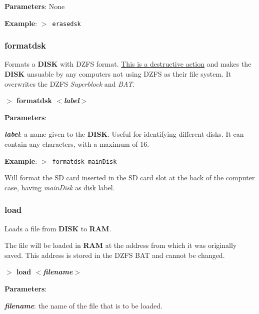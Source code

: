\documentclass[a4paper,11pt]{article}
\begin{document}
        \textbf{Parameters}: None

        \textbf{Example}: \texttt{$>$ erasedsk}

        \subsubsection{{\color{blue}formatdsk}}
        Formats a \textbf{DISK} with DZFS format. \underline{This is a
        destructive action} and makes the \textbf{DISK} unsuable by any
        computers not using DZFS as their file system. It overwrites the DZFS
        \textit{Superblock} and \textit{BAT}.

        \hspace{1.9cm}\textbf{$>$ formatdsk \textit{$<$label$>$}}

        \textbf{Parameters}:

        \hspace{1cm}\textbf{\textit{label}}: a name given to the \textbf{DISK}.
        Useful for identifying different disks. It can contain any characters,
        with a maximum of 16.

        \textbf{Example}: \texttt{$>$ formatdsk mainDisk}

        Will format the SD card inserted in the SD card slot at the back of the
        computer case, having \textit{mainDisk} as disk label.

        \subsubsection{{\color{blue}load}}\label{cmd:load}
        Loads a file from \textbf{DISK} to \textbf{RAM}.
        
        The file will be loaded in \textbf{RAM} at the address from which it was
        originally saved. This address is stored in the DZFS BAT and cannot be
        changed. 

        \hspace{1.9cm}\textbf{$>$ load \textit{$<$filename$>$}}

        \textbf{Parameters}:

        \hspace{1cm}\textbf{\textit{filename}}: the name of the file that is to
        be loaded.
\end{document}
